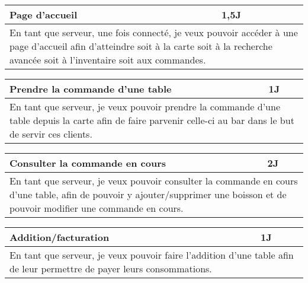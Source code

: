 \begin{center}
	\begin{tabular}{ll}
		\hline
			\multicolumn{1}{|p{14cm}|}{Page d'accueil} & \multicolumn{1}{p{0.7cm}|}{1,5J} \\ 
		\hline
			\multicolumn{2}{|p{15cm}|}{En tant que serveur, une fois connecté, je veux 
			pouvoir accéder à une page d'accueil afin d'atteindre soit à la carte soit à la 
			recherche avancée soit à l'inventaire soit aux commandes.} \\
		\hline
	\end{tabular}

	\vspace{1cm}
	
	\begin{tabular}{ll}
		\hline
			\multicolumn{1}{|p{14cm}|}{Prendre la commande d'une table} & \multicolumn{1}{p{0.7cm}|}{1J} \\ 
		\hline
			\multicolumn{2}{|p{15cm}|}{En tant que serveur, je veux pouvoir prendre la commande
			d'une table depuis la carte afin de faire parvenir celle-ci au bar dans le but 
			de servir ces clients.} \\
		\hline
	\end{tabular}

	\vspace{1cm}
	
	\begin{tabular}{ll}
		\hline
			\multicolumn{1}{|p{14cm}|}{Consulter la commande en cours} & \multicolumn{1}{p{0.7cm}|}{2J} \\ 
		\hline
			\multicolumn{2}{|p{15cm}|}{En tant que serveur, je veux pouvoir consulter
			la commande en cours d'une table, afin de pouvoir y ajouter/supprimer une
			boisson et de pouvoir modifier une commande en cours.} \\
		\hline
	\end{tabular}

	\vspace{1cm}
	
	\begin{tabular}{ll}
		\hline
			\multicolumn{1}{|p{14cm}|}{Addition/facturation} & \multicolumn{1}{p{0.7cm}|}{1J} \\ 
		\hline
			\multicolumn{2}{|p{15cm}|}{En tant que serveur, je veux pouvoir faire l'addition 
			d'une table afin de leur permettre de payer leurs consommations.} \\
		\hline
	\end{tabular}


\end{center}
